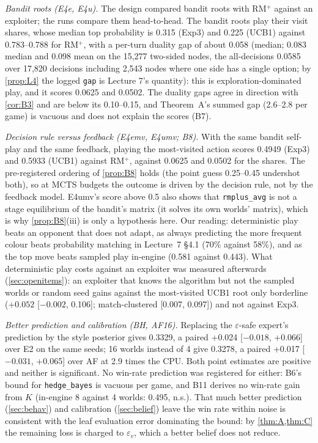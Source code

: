 \documentclass[10pt]{article}
\theoremstyle{plain}
\theoremstyle{definition}
\theoremstyle{remark}
\newcommand{\epsv}{\varepsilon_v}
\begin{document}
\emph{Bandit roots (E4e, E4u).} The design compared bandit roots with RM$^+$ against an exploiter; the runs compare
them head-to-head. The bandit roots play their visit shares, whose median top probability is 0.315 (Exp3) and 0.225
(UCB1) against 0.783--0.788 for RM$^+$, with a per-turn duality gap of about 0.058 (median; 0.083 median and 0.098 mean on the 15,277 two-sided nodes, the all-decisions 0.0585 over 17,820 decisions including 2,543 nodes where one side has a single option; by \cref{prop:L4} the logged \texttt{gap} is Lecture 7's quantity): this is exploration-dominated
play, and it scores 0.0625 and 0.0502. The duality gaps agree in direction with \cref{cor:B3} and are
below its 0.10--0.15, and Theorem~A's summed gap (2.6--2.8 per game) is vacuous and does not explain the scores (B7).

\emph{Decision rule versus feedback (E4emv, E4umv; B8).} With the same bandit self-play and the same feedback, playing
the most-visited action scores 0.4949 (Exp3) and 0.5933 (UCB1) against RM$^+$, against 0.0625 and 0.0502 for the shares.
The pre-registered ordering of \cref{prop:B8} holds (the point guess 0.25--0.45 undershot both), so at MCTS budgets the
outcome is driven by the decision rule, not by the feedback model. E4umv's score above 0.5 also shows that \texttt{rmplus\_avg} is not a stage equilibrium of the
bandit's matrix (it solves its own worlds' matrix), which is why \cref{prop:B8}(iii) is only a hypothesis here. Our
reading: deterministic play beats an opponent that does not adapt, as always predicting the more frequent colour beats
probability matching in Lecture~7 \S4.1 (70\% against 58\%), and as the top move beats sampled play in-engine (0.581
against 0.443). What deterministic play costs against an exploiter was measured afterwards (\cref{sec:openitems}): an exploiter that
knows the algorithm but not the sampled worlds or random seed gains against the most-visited UCB1 root only borderline ($+0.052$ [$-0.002$, 0.106]; match-clustered [0.007, 0.097]) and not against Exp3.

\emph{Better prediction and calibration (BH, AF16).} Replacing the $\varepsilon$-safe expert's prediction by the style posterior
gives 0.3329, a paired +0.024 [$-0.018$, +0.066] over E2 on the same seeds; 16 worlds instead of 4 give 0.3278, a paired
+0.017 [$-0.031$, +0.065] over AF at 2.9 times the CPU. Both point estimates are positive and neither is significant. No
win-rate prediction was registered for either: B6's bound for \texttt{hedge\_bayes} is vacuous per game, and B11 derives
no win-rate gain from $K$ (in-engine 8 against 4 worlds: 0.495, n.s.). That much better prediction (\cref{sec:behav})
and calibration (\cref{sec:belief}) leave the win rate within noise is consistent with the leaf evaluation error dominating the bound: by
\cref{thm:A,thm:C} the remaining loss is charged to $\epsv$, which a better belief does not reduce.
\end{document}
